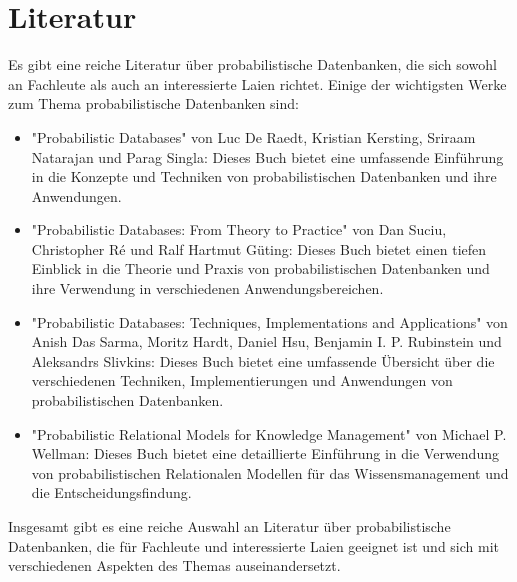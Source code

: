 \chapter{Literatur}
Es gibt eine reiche Literatur über probabilistische Datenbanken, die sich sowohl an Fachleute als auch an interessierte Laien richtet. Einige der wichtigsten Werke zum Thema probabilistische Datenbanken sind:

\begin{itemize}
	\item "Probabilistic Databases" von Luc De Raedt, Kristian Kersting, Sriraam Natarajan und Parag Singla: Dieses Buch bietet eine umfassende Einführung in die Konzepte und Techniken von probabilistischen Datenbanken und ihre Anwendungen.
	
	\item "Probabilistic Databases: From Theory to Practice" von Dan Suciu, Christopher Ré und Ralf Hartmut Güting: Dieses Buch bietet einen tiefen Einblick in die Theorie und Praxis von probabilistischen Datenbanken und ihre Verwendung in verschiedenen Anwendungsbereichen.
	
	\item "Probabilistic Databases: Techniques, Implementations and Applications" von Anish Das Sarma, Moritz Hardt, Daniel Hsu, Benjamin I. P. Rubinstein und Aleksandrs Slivkins: Dieses Buch bietet eine umfassende Übersicht über die verschiedenen Techniken, Implementierungen und Anwendungen von probabilistischen Datenbanken.
	
	
	\item "Probabilistic Relational Models for Knowledge Management" von Michael P. Wellman: Dieses Buch bietet eine detaillierte Einführung in die Verwendung von probabilistischen Relationalen Modellen für das Wissensmanagement und die Entscheidungsfindung.
	
	
\end{itemize}
Insgesamt gibt es eine reiche Auswahl an Literatur über probabilistische Datenbanken, die für Fachleute und interessierte Laien geeignet ist und sich mit verschiedenen Aspekten des Themas auseinandersetzt.




